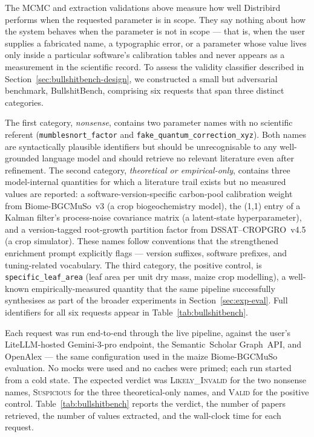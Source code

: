 \documentclass[11pt,a4paper]{article}
\begin{document}
The MCMC and extraction validations above measure how well Distribird performs when the requested parameter is in scope. They say nothing about how the system behaves when the parameter is not in scope --- that is, when the user supplies a fabricated name, a typographic error, or a parameter whose value lives only inside a particular software's calibration tables and never appears as a measurement in the scientific record. To assess the validity classifier described in Section~\ref{sec:bullshitbench-design}, we constructed a small but adversarial benchmark, BullshitBench, comprising six requests that span three distinct categories.

The first category, \emph{nonsense}, contains two parameter names with no scientific referent (\texttt{mumblesnort\_\allowbreak factor} and \texttt{fake\_\allowbreak quantum\_\allowbreak correction\_\allowbreak xyz}). Both names are syntactically plausible identifiers but should be unrecognisable to any well-grounded language model and should retrieve no relevant literature even after refinement. The second category, \emph{theoretical or empirical-only}, contains three model-internal quantities for which a literature trail exists but no measured values are reported: a software-version-specific carbon-pool calibration weight from Biome-BGCMuSo~v3 (a crop biogeochemistry model), the (1,1) entry of a Kalman filter's process-noise covariance matrix (a latent-state hyperparameter), and a version-tagged root-growth partition factor from DSSAT--CROPGRO~v4.5 (a crop simulator). These names follow conventions that the strengthened enrichment prompt explicitly flags --- version suffixes, software prefixes, and tuning-related vocabulary. The third category, the positive control, is \texttt{specific\_leaf\_area} (leaf area per unit dry mass, maize crop modelling), a well-known empirically-measured quantity that the same pipeline successfully synthesises as part of the broader experiments in Section~\ref{sec:exp-eval}. Full identifiers for all six requests appear in Table~\ref{tab:bullshitbench}.

Each request was run end-to-end through the live pipeline, against the user's LiteLLM-hosted Gemini-3-pro endpoint, the Semantic~Scholar Graph~API, and OpenAlex --- the same configuration used in the maize Biome-BGCMuSo evaluation. No mocks were used and no caches were primed; each run started from a cold state. The expected verdict was \textsc{Likely\_Invalid} for the two nonsense names, \textsc{Suspicious} for the three theoretical-only names, and \textsc{Valid} for the positive control. Table~\ref{tab:bullshitbench} reports the verdict, the number of papers retrieved, the number of values extracted, and the wall-clock time for each request.
\end{document}
